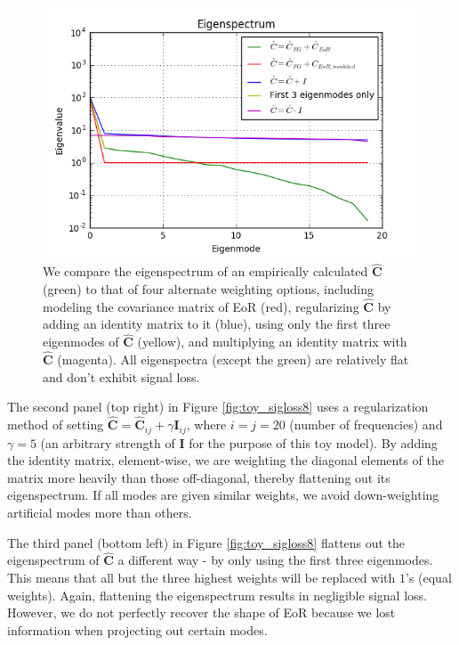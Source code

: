 \documentclass[preprint2,numberedappendix,tighten]{aastex6}  %
\begin{document}
\begin{figure}
	\centering
	\includegraphics[trim={0.3cm 0.3cm 0.3cm 0.3cm},clip,width=\columnwidth]{plots/toy_sigloss14.png}
	\caption{We compare the eigenspectrum of an empirically calculated $\hat{\textbf{C}}$ (green) to that of four alternate weighting options, including modeling the covariance matrix of EoR (red), regularizing $\hat{\textbf{C}}$ by adding an identity matrix to it (blue), using only the first three eigenmodes of $\hat{\textbf{C}}$ (yellow), and multiplying an identity matrix with $\hat{\textbf{C}}$ (magenta). All eigenspectra (except the green) are relatively flat and don't exhibit signal loss.}
	\label{fig:toy_sigloss14}
\end{figure}

The second panel (top right) in Figure \ref{fig:toy_sigloss8} uses a regularization method of setting $\hat{\textbf{C}} = \hat{\textbf{C}}_{ij} + \gamma\textbf{I}_{ij}$, where $i$$=$$j$$=$$20$ (number of frequencies) and $\gamma = 5$ (an arbitrary strength of $\textbf{I}$ for the purpose of this toy model). By adding the identity matrix, element-wise, we are weighting the diagonal elements of the matrix more heavily than those off-diagonal, thereby flattening out its eigenspectrum. If all modes are given similar weights, we avoid down-weighting artificial modes more than others.  

The third panel (bottom left) in Figure \ref{fig:toy_sigloss8} flattens out the eigenspectrum of $\hat{\textbf{C}}$ a different way - by only using the first three eigenmodes. This means that all but the three highest weights will be replaced with $1$'s (equal weights). Again, flattening the eigenspectrum results in negligible signal loss. However, we do not perfectly recover the shape of EoR because we lost information when projecting out certain modes. 
\end{document}

